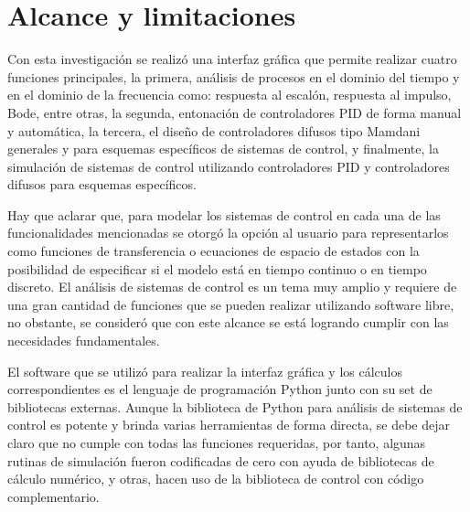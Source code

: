 \section{Alcance y limitaciones}

	Con esta investigación se realizó una interfaz gráfica que permite realizar cuatro funciones principales, la primera, análisis de procesos en el dominio del tiempo y en el dominio de la frecuencia como: respuesta al escalón, respuesta al impulso, Bode, entre otras, la segunda, entonación de controladores PID de forma manual y automática, la tercera, el diseño de controladores difusos tipo Mamdani generales y para esquemas específicos de sistemas de control, y finalmente, la simulación de sistemas de control utilizando controladores PID y controladores difusos para esquemas específicos.

	Hay que aclarar que, para modelar los sistemas de control en cada una de las funcionalidades mencionadas se otorgó la opción al usuario para representarlos como funciones de transferencia o ecuaciones de espacio de estados con la posibilidad de especificar si el modelo está en tiempo continuo o en tiempo discreto. El análisis de sistemas de control es un tema muy amplio y requiere de una gran cantidad de funciones que se pueden realizar utilizando software libre, no obstante, se consideró que con este alcance se está logrando cumplir con las necesidades fundamentales. 

	El software que se utilizó para realizar la interfaz gráfica y los cálculos correspondientes es el lenguaje de programación Python junto con su set de bibliotecas externas. Aunque la biblioteca de Python para análisis de sistemas de control es potente y brinda varias herramientas de forma directa, se debe dejar claro que no cumple con todas las funciones requeridas, por tanto, algunas rutinas de simulación fueron codificadas de cero con ayuda de bibliotecas de cálculo numérico, y otras, hacen uso de la biblioteca de control con código complementario.
